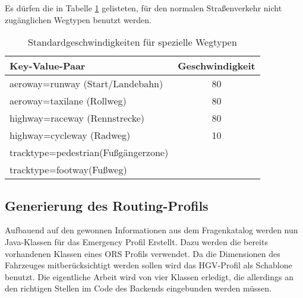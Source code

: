 Es dürfen die in Tabelle \ref{tab:speedinfospecial} gelisteten, für den normalen Straßenverkehr nicht zugänglichen Wegtypen benutzt werden.

\begin{table}
\caption{Standardgeschwindigkeiten für spezielle Wegtypen}
\label{tab:speedinfospecial}
\centering
\begin{tabular}{|l|c|}
\hline
\multicolumn{1}{|l|}{Key-Value-Paar} & \multicolumn{1}{c|}{Geschwindigkeit} \\
\hline
aeroway=runway (Start/Landebahn) & 80 \\
aeroway=taxilane (Rollweg) & 80 \\
highway=raceway (Rennstrecke) & 80 \\
highway=cycleway (Radweg) & 10 \\
tracktype=pedestrian(Fußgängerzone) & \\
tracktype=footway(Fußweg) & \\
\hline
\end{tabular}
\end{table}



\subsection{Generierung des Routing-Profils}
\label{backendGraphBuild}

Aufbauend auf den gewonnen Informationen aus dem Fragenkatalog werden nun Java-Klassen für das Emergency Profil Erstellt.
Dazu werden die bereits vorhandenen Klassen eines ORS Profils verwendet.
Da die Dimensionen des Fahrzeuges mitberücksichtigt werden sollen wird das HGV-Profil als Schablone benutzt.
Die eigentliche Arbeit wird von vier Klassen erledigt, die allerdings an den richtigen Stellen im Code des Backends eingebunden werden müssen.

% 

